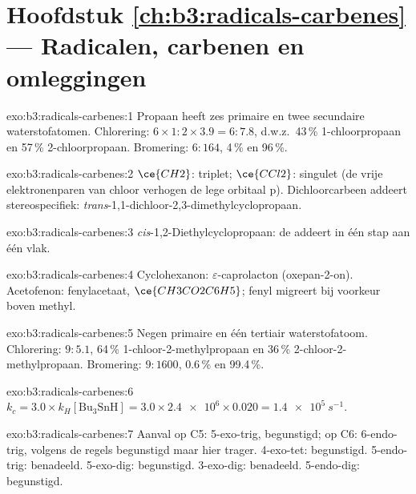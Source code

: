 \section*{Hoofdstuk \ref{ch:b3:radicals-carbenes} --- Radicalen, carbenen en omleggingen}

\begin{solution}{exo:b3:radicals-carbenes:1}
Propaan heeft zes primaire en twee secundaire waterstofatomen. Chlorering: $6 \times 1 : 2 \times 3.9 = 6 : 7.8$,
d.w.z.\ 43\,\% 1-chloorpropaan en 57\,\% 2-chloorpropaan. Bromering: $6 : 164$, 4\,\% en
96\,\%.
\end{solution}

\begin{solution}{exo:b3:radicals-carbenes:2}
$\ce{CH2}$: triplet; $\ce{CCl2}$: singulet (de vrije elektronenparen van chloor verhogen de lege orbitaal p).
Dichloorcarbeen addeert stereospecifiek: \textit{trans}-1,1-dichloor-2,3-dimethylcyclopropaan.
\end{solution}

\begin{solution}{exo:b3:radicals-carbenes:3}
\textit{cis}-1,2-Diethylcyclopropaan: de  addeert in één stap aan één vlak.
\end{solution}

\begin{solution}{exo:b3:radicals-carbenes:4}
Cyclohexanon: $\varepsilon$-caprolacton (oxepan-2-on). Acetofenon: fenylacetaat,
$\ce{CH3CO2C6H5}$; fenyl migreert bij voorkeur boven methyl.
\end{solution}

\begin{solution}{exo:b3:radicals-carbenes:5}
Negen primaire en één tertiair waterstofatoom. Chlorering: $9 : 5.1$, 64\,\% 1-chloor-2-methylpropaan
en 36\,\% 2-chloor-2-methylpropaan. Bromering: $9 : 1600$, 0.6\,\% en 99.4\,\%.
\end{solution}

\begin{solution}{exo:b3:radicals-carbenes:6}
$k_c = 3.0 \times k_H[\mathrm{Bu_3SnH}] = 3.0 \times \num{2.4e6} \times 0.020 = \qty{1.4e5}{s^{-1}}$.
\end{solution}

\begin{solution}{exo:b3:radicals-carbenes:7}
Aanval op C5: 5-exo-trig, begunstigd; op C6: 6-endo-trig, volgens de
regels begunstigd maar hier trager. 4-exo-tet: begunstigd. 5-endo-trig:
benadeeld. 5-exo-dig: begunstigd.
3-exo-dig: benadeeld. 5-endo-dig: begunstigd.
\end{solution}

